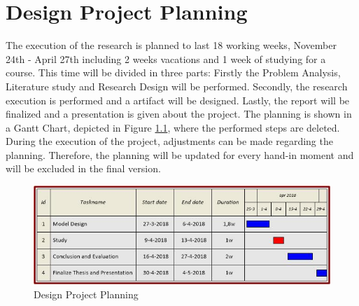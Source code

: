 
\chapter{Design Project Planning} \label{AppendixC}
The execution of the research is planned to last 18 working weeks, November 24th - April 27th including 2 weeks vacations and 1 week of studying for a course. This time will be divided in three parts: Firstly the Problem Analysis, Literature study and Research Design will be performed. Secondly, the research execution is performed and a artifact will be designed. Lastly, the report will be finalized and a presentation is given about the project. The planning is shown in a Gantt Chart, depicted in Figure \ref{fig:Planning}, where the performed steps are deleted. During the execution of the project, adjustments can be made regarding the planning. Therefore, the planning will be updated for every hand-in moment and will be excluded in the final version.
\begin{figure}[ht]
\centering
\includegraphics[width=\textwidth]{Figures/Research_Planning2}
\caption{Design Project Planning}
\label{fig:Planning}
\end{figure}